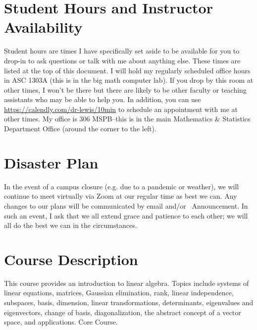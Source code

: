 \documentclass{article}
\begin{document}
\section*{\fontsize{12}{15}\selectfont Student Hours and Instructor Availability}

Student  hours are times I have specifically set aside to be available for you to drop-in to ask questions or talk with me about anything else. These times are listed at the top of this document. I will hold my regularly scheduled office hours in ASC 1303A (this is in the big math computer lab).  If you drop by this room at other times, I won't be there but there are likely to be other faculty or teaching assistants who may be able to help you.  In addition, you can use \url{https://calendly.com/dr-lewis/10min} to schedule an appointment with me at other times. My office is 306 MSPB--this is in the main Mathematics \& Statistics Department Office (around the corner to the left).

\section*{\fontsize{12}{15}\selectfont Disaster Plan}
In the event of a campus closure (e.g. due to a pandemic or weather), we will continue to meet virtually via Zoom at our regular time as best we can. Any changes to our plans will be communicated by email and/or \LMS\ Announcement. In such an event, I ask that we all extend grace and patience to each other; we will all do the best we can in the circumstances.

\section*{\fontsize{12}{15}\selectfont Course Description}
This course provides an introduction to linear algebra. Topics include systems of linear equations, matrices, Gaussian elimination, rank, linear independence, subspaces, basis, dimension, linear transformations, determinants, eigenvalues and eigenvectors, change of basis, diagonalization, the abstract concept of a vector space, and applications. Core Course.
\end{document}
